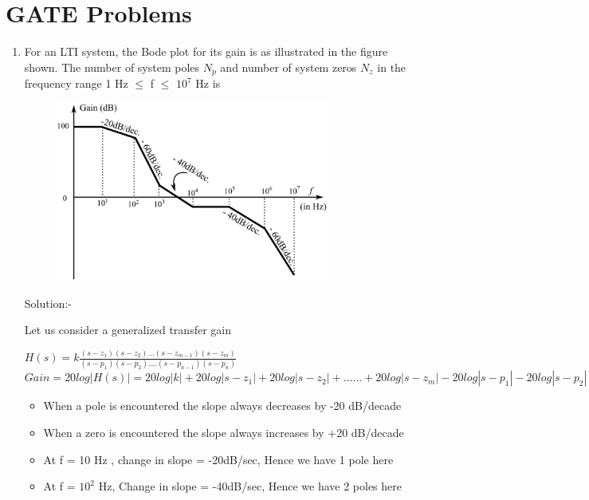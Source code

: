 \documentclass[journal,12pt,twocolumn]{IEEEtran}
\renewcommand\thesection{\arabic{section}}
\begin{document}
\section{GATE Problems}
\begin{enumerate}[label=\arabic*.,ref=\thesection.\theenumi]
\item
\textsf{ For an LTI system, the Bode plot for its gain is as illustrated in the figure shown. The number of system poles $N_{p}$ and number of system zeros $N_{z}$ in the frequency range 1 Hz $\leq$ f $\leq$ $10^{7}$ Hz is}

\begin{figure}[htp]
    \centering
    \includegraphics[width=9cm]{./figs/figure.eps}
    
    \label{fig:galaxy}
\end{figure}

{ Solution:- }
\begin{flushleft}
\textsf{Let us consider a generalized transfer gain}
\end{flushleft}
\vspace{10pt}
$H(s) = k \frac{(s-z_{1})(s-z_{2})...(s-z_{m-1})(s-z_{m})}{(s-p_{1})(s-p_{2})....(s-p_{n-1})(s-p_{n})}$\vspace{18pt}\\
$Gain = 20log|H(s)| = 20log|k| + 20log|s-z_{1}| + 20log|s-z_{2}| + ...... + 20log|s-z_{m}| - 20log|s-p_{1}| - 20log|s-p_{2}| - ..... - 20log|s-p_{n}| $ \vspace{18pt}

\begin{itemize}
    \item  When a pole is encountered the slope always decreases by -20 dB/decade
    \item When a zero is encountered the slope always increases by +20 dB/decade
\end{itemize}
\begin{itemize}
    \item At f = 10 Hz , change in slope = -20dB/sec, Hence we have 1 pole here
    \item At f = $10^{2}$ Hz, Change in slope = -40dB/sec, Hence we have 2 poles here
    

\end{itemize}
\end{enumerate}
\end{document}
